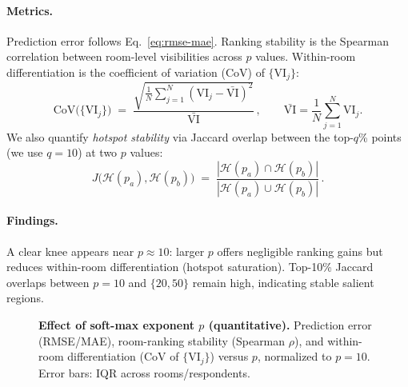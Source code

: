 \documentclass[final,3p,times,review]{elsarticle}
\begin{document}
\paragraph{Metrics.}
Prediction error follows Eq.~\eqref{eq:rmse-mae}. Ranking stability is the Spearman correlation between room-level visibilities across $p$ values. Within-room differentiation is the coefficient of variation (CoV) of $\{\mathrm{VI}_j\}$:
\begin{equation}
\mathrm{CoV}\big(\{\mathrm{VI}_j\}\big) \;=\; \frac{\sqrt{\frac{1}{N}\sum_{j=1}^N(\mathrm{VI}_j-\bar{\mathrm{VI}})^2}}{\bar{\mathrm{VI}}}
\,, \qquad
\bar{\mathrm{VI}}=\frac{1}{N}\sum_{j=1}^N \mathrm{VI}_j.
\label{eq:cov-vi}
\end{equation}
We also quantify \emph{hotspot stability} via Jaccard overlap between the top-$q$\% points (we use $q{=}10$) at two $p$ values:
\begin{equation}
J\!\big(\mathcal{H}(p_a),\mathcal{H}(p_b)\big) \;=\; 
\frac{ \left| \mathcal{H}(p_a)\cap \mathcal{H}(p_b) \right| }
     { \left| \mathcal{H}(p_a)\cup \mathcal{H}(p_b) \right| } \,.
\label{eq:jaccard}
\end{equation}

\paragraph{Findings.}
A clear knee appears near $p{\approx}10$: larger $p$ offers negligible ranking gains but reduces within-room differentiation (hotspot saturation). Top-10\% Jaccard overlaps between $p{=}10$ and $\{20,50\}$ remain high, indicating stable salient regions.

\begin{figure}[t]
  \centering
  \caption{\textbf{Effect of soft-max exponent $p$ (quantitative).} Prediction error (RMSE/MAE), room-ranking stability (Spearman $\rho$), and within-room differentiation (CoV of $\{\mathrm{VI}_j\}$) versus $p$, normalized to $p{=}10$. Error bars: IQR across rooms/respondents.}
  \label{fig:sens-metrics-p}
\end{figure}
\end{document}
